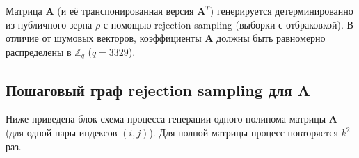 \documentclass[11pt,a4paper]{article}
\begin{document}
Матрица \(\mathbf{A}\) (и её транспонированная версия \(\mathbf{A}^T\)) генерируется детерминированно из публичного зерна \(\rho\) с помощью rejection sampling (выборки с отбраковкой). В отличие от шумовых векторов, коэффициенты \(\mathbf{A}\) должны быть равномерно распределены в \(\mathbb{Z}_q\) (\(q=3329\)).

\subsection{Пошаговый граф rejection sampling для \(\mathbf{A}\)}

Ниже приведена блок-схема процесса генерации одного полинома матрицы \(\mathbf{A}\) (для одной пары индексов \((i,j)\)). Для полной матрицы процесс повторяется \(k^2\) раз.

\newpage


\end{document}
